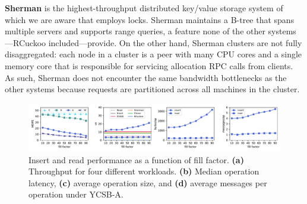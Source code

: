 

\textbf{Sherman} is the highest-throughput distributed key/value
storage system of which we are aware that employs locks.  Sherman
maintains a B-tree that spans multiple servers and supports range
queries, a feature none of the other systems---RCuckoo
included---provide.
On the other
hand, Sherman clusters are not fully disaggregated: each node in a
cluster is a peer with many CPU cores and a single memory core
that is responsible for servicing allocation RPC calls from clients.
As such, Sherman does not encounter the same bandwidth bottlenecks as
the other systems because requests are partitioned across all
machines in the cluster.



\begin{figure}[ht]
    \includegraphics[width=0.99\linewidth]{fig/hero_ycsb_fill.pdf}

    \caption{Insert and read performance as a
    function of fill factor. \textbf{(a)} Throughput for four different workloads. \textbf{(b)}
    Median operation latency, \textbf{(c)} average operation size, and \textbf{(d)}
    average messages per operation under YCSB-A.}

    \label{fig:ycsb_fill}
\end{figure}

